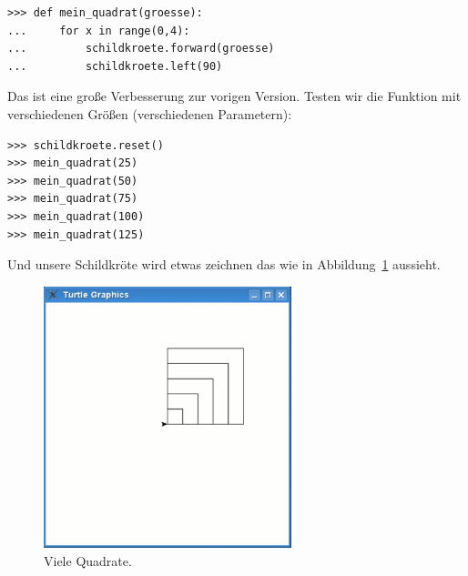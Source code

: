 \begin{Verbatim}[frame=single]
>>> def mein_quadrat(groesse):
...     for x in range(0,4):
...         schildkroete.forward(groesse)
...         schildkroete.left(90)
\end{Verbatim}

Das ist eine große Verbesserung zur vorigen Version. Testen wir die Funktion mit verschiedenen Größen (verschiedenen Parametern):

\begin{Verbatim}[frame=single]
>>> schildkroete.reset()
>>> mein_quadrat(25)
>>> mein_quadrat(50)
>>> mein_quadrat(75)
>>> mein_quadrat(100)
>>> mein_quadrat(125)
\end{Verbatim}

Und unsere Schildkröte wird etwas zeichnen das wie in Abbildung~\ref{fig26} aussieht.

\begin{figure}
\begin{center}
\includegraphics[width=72mm]{images/figure26}
\end{center}
\caption{Viele Quadrate.}\label{fig26}
\end{figure}

